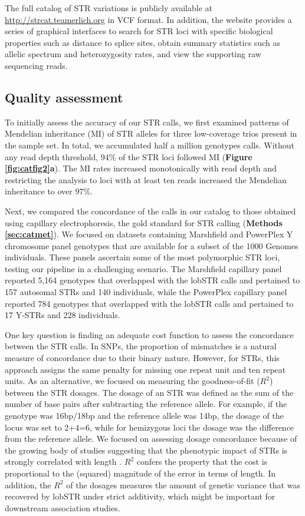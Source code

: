 The full catalog of STR variations is publicly available at \url{http://strcat.teamerlich.org} in VCF format. In addition, the website provides a series of graphical interfaces to search for STR loci with specific biological properties such as distance to splice sites, obtain summary statistics such as allelic spectrum and heterozygosity rates, and view the supporting raw sequencing reads. 

\subsection{Quality assessment}
To initially assess the accuracy of our STR calls, we first examined patterns of Mendelian inheritance (MI) of STR alleles for three low-coverage trios present in the sample set. In total, we accumulated half a million genotypes calls. Without any read depth threshold, 94\% of the STR loci followed MI (\textbf{Figure \ref{fig:catfig2}a}). The MI rates increased monotonically with read depth and restricting the analysis to loci with at least ten reads increased the Mendelian inheritance to over 97\%.  

Next, we compared the concordance of the calls in our catalog to those obtained using capillary electrophoresis, the gold standard for STR calling (\textbf{Methods \ref{sec:catmet}}). We focused on datasets containing Marshfield and PowerPlex Y chromosome panel genotypes that are available for a subset of the 1000 Genomes individuals. These panels ascertain some of the most polymorphic STR loci, testing our pipeline in a challenging scenario. The Marshfield capillary panel \cite{Rosenberg2006} reported 5,164 genotypes that overlapped with the lobSTR calls and pertained to 157 autosomal STRs and 140 individuals, while the PowerPlex capillary panel reported 784 genotypes that overlapped with the lobSTR calls and pertained to 17 Y-STRs and 228 individuals.  

One key question is finding an adequate cost function to assess the concordance between the STR calls. In SNPs, the proportion of mismatches is a natural measure of concordance due to their binary nature. However, for STRs, this approach assigns the same penalty for missing one repeat unit and ten repeat units. As an alternative, we focused on measuring the goodness-of-fit ($R^2$) between the STR dosages. The dosage of an STR was defined as the sum of the number of base pairs after subtracting the reference allele. For example, if the genotype was 16bp/18bp and the reference allele was 14bp, the dosage of the locus was set to 2+4=6, while for hemizygous loci the dosage was the difference from the reference allele. We focused on assessing dosage concordance because of the growing body of studies suggesting that the phenotypic impact of STRs is strongly correlated with length \cite{GebhardtZankerBrandt1999,ShimajiriArimaTanimotoEtAl1999,ContenteDittmerKochEtAl2002,HefferonGromanYurkEtAl2004}. $R^2$ confers the property that the cost is proportional to the (squared) magnitude of the error in terms of length. In addition, the $R^2$ of the dosages measures the amount of genetic variance that was recovered by lobSTR under strict additivity, which might be important for downstream association studies. 

